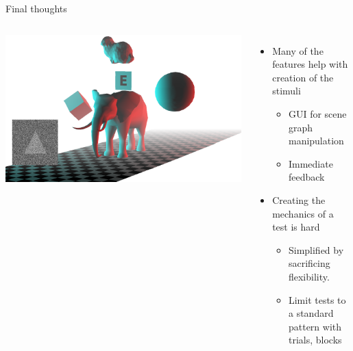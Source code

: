 \documentclass[12pt,ucs,hyperref={pdftext}]{beamer}
\newlength{\columnleft}
\newlength{\columnright}
\begin{document}
\begin{frame}{Final thoughts}
\begin{columns}

\column{\columnleft}
\includegraphics[width=\columnleft]{media/title.png}

\column{\columnright}
\begin{itemize}%
\item Many of the features help with creation of the stimuli
\begin{itemize}
\item GUI for scene graph manipulation
\item Immediate feedback
\end{itemize}
\item Creating the mechanics of a test is hard
\begin{itemize}
\item Simplified by sacrificing flexibility.
\item Limit tests to a standard pattern with trials, blocks
\end{itemize}
\end{itemize}

\end{columns}
\end{frame}
\end{document}
